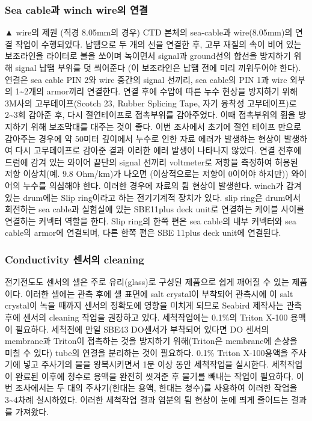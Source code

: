 \documentclass[
]{book}
\begin{document}
\hypertarget{sea-cableuxacfc-winch-wireuxc758-uxc5f0uxacb0}{%
\subsubsection{Sea cable과 winch wire의 연결}\label{sea-cableuxacfc-winch-wireuxc758-uxc5f0uxacb0}}

▲ wire의 제원 (직경 8.05mm의 경우)
CTD 본체의 sea-cable과 wire(8.05mm)의 연결 작업이 수행되었다. 납땜으로 두 개의 선을 연결한 후, 고무 재질의 속이 비어 있는 보조라인을 라이터로 불을 쏘이며 녹이면서 signal과 ground선의 합선을 방지하기 위해 signal 납땜 부위를 덧 씌어준다 (이 보조라인은 납땜 전에 미리 끼워두어야 한다). 연결은 sea cable PIN 2와 wire 중간의 signal 선끼리, sea cable의 PIN 1과 wire 외부의 1\textasciitilde2개의 armor끼리 연결한다. 연결 후에 수압에 따른 누수 현상을 방지하기 위해 3M사의 고무테이프(Scotch 23, Rubber Splicing Tape, 자기 융착성 고무테이프)로 2\textasciitilde3회 감아준 후, 다시 절연테이프로 접촉부위를 감아주었다. 이때 접촉부위의 휨을 방지하기 위해 보조막대를 대주는 것이 좋다. 이번 조사에서 초기에 절연 테이프 만으로 감아주는 경우에 약 50미터 깊이에서 누수로 인한 자료 에러가 발생하는 현상이 발생하여 다시 고무테이프로 감아준 결과 이러한 에러 발생이 나타나지 않았다. 연결 전후에 드럼에 감겨 있는 와이어 끝단의 signal 선끼리 voltmeter로 저항을 측정하여 허용된 저항 이상치(예. 9.8 Ohm/km)가 나오면 (이상적으로는 저항이 0이어야 하지만)) 와이어의 누수를 의심해야 한다. 이러한 경우에 자료의 튐 현상이 발생한다.
winch가 감겨 있는 drum에는 Slip ring이라고 하는 전기기계적 장치가 있다. slip ring은 drum에서 회전하는 sea cable과 실험실에 있는 SBE11plus deck unit로 연결하는 케이블 사이를 연결하는 커넥터 역할을 한다. Slip ring의 한쪽 편은 sea cable의 내부 커넥터와 sea cable의 armor에 연결되며, 다른 한쪽 편은 SBE 11plus deck unit에 연결된다.

\hypertarget{conductivity-uxc13cuxc11cuxc758-cleaning}{%
\subsubsection{Conductivity 센서의 cleaning}\label{conductivity-uxc13cuxc11cuxc758-cleaning}}

전기전도도 센서의 셀은 주로 유리(glass)로 구성된 제품으로 쉽게 깨어질 수 있는 제품이다. 이러한 셀에는 관측 후에 셀 표면에 salt crystal이 부착되어 관측시에 이 salt crystal이 녹을 때까지 센서의 정확도에 영향을 미치게 되므로 Seabird 제작사는 관측후에 센서의 cleaning 작업을 권장하고 있다. 세척작업에는 0.1\%의 Triton X-100 용액이 필요하다. 세척전에 만일 SBE43 DO센서가 부착되어 있다면 DO 센서의 membrane과 Triton이 접촉하는 것을 방지하기 위해(Triton은 membrane에 손상을 미칠 수 있다) tube의 연결을 분리하는 것이 필요하다. 0.1\% Triton X-100용액을 주사기에 넣고 주사기의 물을 왕복시키면서 1분 이상 동안 세척작업을 실시한다. 세척작업이 완료된 이후에 청수로 용액을 완전히 씻겨준 후 물기를 빼내는 작업이 필요하다. 이번 조사에서는 두 대의 주사기(한대는 용액, 한대는 청수)를 사용하여 이러한 작업을 3\textasciitilde4차례 실시하였다. 이러한 세척작업 결과 염분의 튐 현상이 눈에 띄게 줄어드는 결과를 가져왔다.
\end{document}

